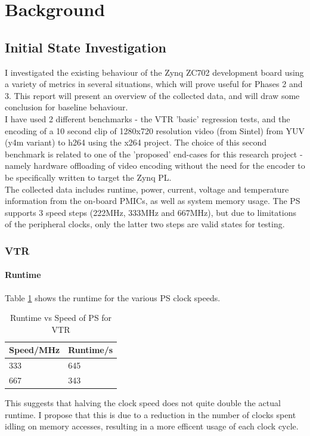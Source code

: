 \documentclass[a4paper]{article}
\begin{document}
\section{Background}
  \subsection{Initial State Investigation}

  I investigated the existing behaviour of the Zynq ZC702 development board using a variety of metrics in several situations, which will prove useful for Phases 2 and 3.
  This report will present an overview of the collected data, and will draw some conclusion for baseline behaviour.\\
  I have used 2 different benchmarks - the VTR 'basic' regression tests, and the encoding of a 10 second clip of 1280x720 resolution video (from Sintel) from YUV (y4m variant) to h264 using the x264 project.
  The choice of this second benchmark is related to one of the 'proposed' end-cases for this research project - namely hardware offloading of video encoding without the need for the encoder to be specifically written to target the Zynq PL.\\
  The collected data includes runtime, power, current, voltage and temperature information from the on-board PMICs, as well as system memory usage. The PS supports 3 speed steps (222MHz, 333MHz and 667MHz), but due to limitations of the peripheral clocks, only the latter two steps are valid states for testing.

\subsubsection{VTR}
  \paragraph{Runtime}
    Table \ref{tab:vtr:rt} shows the runtime for the various PS clock speeds.
    \begin{table}[tbp]
      \centering
      \begin{tabular}{l | l}
        Speed/MHz & Runtime/s \\
        \hline
        333 & 645 \\
        667 & 343 \\
      \end{tabular}
      \caption{Runtime vs Speed of PS for VTR}
      \label{tab:vtr:rt}
    \end{table}
    This suggests that halving the clock speed does not quite double the actual runtime. I propose that this is due to a reduction in the number of clocks spent idling on memory accesses, resulting in a more efficent usage of each clock cycle.
\end{document}

